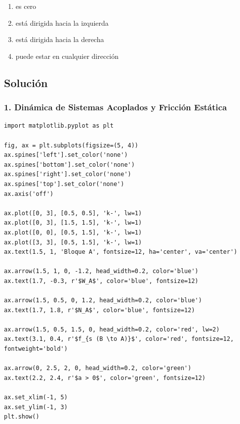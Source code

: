\documentclass[12pt, a4paper]{article}
\begin{document}
\begin{center}
\end{center}

\begin{enumerate}[label=\alph*)]
    \item es cero
    \item está dirigida hacia la izquierda
    \item está dirigida hacia la derecha
    \item puede estar en cualquier dirección
\end{enumerate}

\subsection*{Solución}

\subsubsection*{1. Dinámica de Sistemas Acoplados y Fricción Estática}

\begin{verbatim}
import matplotlib.pyplot as plt

fig, ax = plt.subplots(figsize=(5, 4))
ax.spines['left'].set_color('none')
ax.spines['bottom'].set_color('none')
ax.spines['right'].set_color('none')
ax.spines['top'].set_color('none')
ax.axis('off')

ax.plot([0, 3], [0.5, 0.5], 'k-', lw=1)
ax.plot([0, 3], [1.5, 1.5], 'k-', lw=1)
ax.plot([0, 0], [0.5, 1.5], 'k-', lw=1)
ax.plot([3, 3], [0.5, 1.5], 'k-', lw=1)
ax.text(1.5, 1, 'Bloque A', fontsize=12, ha='center', va='center')

ax.arrow(1.5, 1, 0, -1.2, head_width=0.2, color='blue')
ax.text(1.7, -0.3, r'$W_A$', color='blue', fontsize=12)

ax.arrow(1.5, 0.5, 0, 1.2, head_width=0.2, color='blue')
ax.text(1.7, 1.8, r'$N_A$', color='blue', fontsize=12)

ax.arrow(1.5, 0.5, 1.5, 0, head_width=0.2, color='red', lw=2)
ax.text(3.1, 0.4, r'$f_{s (B \to A)}$', color='red', fontsize=12, fontweight='bold')

ax.arrow(0, 2.5, 2, 0, head_width=0.2, color='green')
ax.text(2.2, 2.4, r'$a > 0$', color='green', fontsize=12)

ax.set_xlim(-1, 5)
ax.set_ylim(-1, 3)
plt.show()
\end{verbatim}
\end{document}
